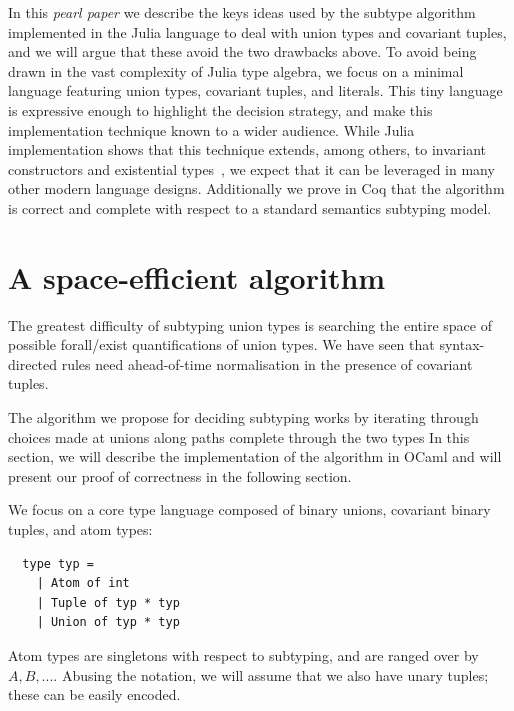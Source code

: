 \documentclass[a4paper,english]{lipics-v2019}
\begin{document}
In this \emph{pearl paper} we describe the keys ideas used by the
subtype algorithm implemented in the Julia language to deal with
union types and covariant tuples, and we will argue that these avoid the
two drawbacks above.  To avoid being drawn in the vast complexity of
Julia type algebra, we focus on a minimal language featuring union
types, covariant tuples, and literals.  This tiny language is
expressive enough to highlight the decision strategy, and make this
implementation technique known to a wider audience.  While Julia
implementation shows that this technique extends, among others, to
invariant constructors and existential
types~\cite{DBLP:NardelliBPCBV18}, we expect that it
can be leveraged in many other modern language designs.  Additionally
we prove in Coq that the algorithm is correct and complete with
respect to a standard semantics subtyping model.


\section{A space-efficient algorithm}

The greatest difficulty of subtyping union types is searching the entire space
of possible forall/exist quantifications of union types. We have seen that
syntax-directed rules need ahead-of-time normalisation in the presence of
covariant tuples.

The algorithm we propose for deciding subtyping works by iterating through
choices made at unions along paths complete through the two types In this
section, we will describe the implementation of the algorithm in OCaml and
will present our proof of correctness in the following section.

We focus on a core type language composed of binary unions, covariant binary
tuples, and atom types:
\begin{small}
\begin{verbatim}
  type typ =
    | Atom of int
    | Tuple of typ * typ
    | Union of typ * typ
\end{verbatim}
\end{small}
Atom types are singletons with respect to subtyping, and are ranged
over by
\(A, B, ...\).  Abusing the
notation, we will assume that we also have unary
tuples; these can be easily encoded. 
\end{document}

